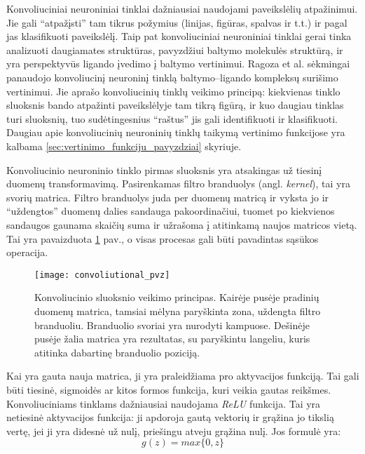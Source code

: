 Konvoliuciniai neuroniniai tinklai dažniausiai naudojami paveikslėlių atpažinimui. Jie gali \enquote{atpažįsti} tam tikrus požymius (linijas, figūras, spalvas ir t.t.) ir pagal jas klasifikuoti paveikslėlį. Taip pat konvoliuciniai neuroniniai tinklai gerai tinka analizuoti daugiamates struktūras, pavyzdžiui baltymo molekulės struktūrą, ir yra perspektyvūs ligando įvedimo į baltymo vertinimui.\cite{hochuli_visualizing_2018} Ragoza et al.\cite{ragoza_proteinligand_2017} sėkmingai panaudojo konvoliucinį neuroninį tinklą baltymo--ligando kompleksų surišimo vertinimui. Jie aprašo konvoliucinių tinklų veikimo principą: kiekvienas tinklo sluoksnis bando atpažinti paveikslėlyje tam tikrą figūrą, ir kuo daugiau tinklas turi sluoksnių, tuo sudėtingesnius \enquote{raštus} jis gali identifikuoti ir klasifikuoti. Daugiau apie konvoliucinių neuroninių tinklų taikymą vertinimo funkcijose yra kalbama \ref{sec:vertinimo_funkciju_pavyzdziai} skyriuje.

Konvoliucinio neuroninio tinklo pirmas sluoksnis yra atsakingas už tiesinį duomenų transformavimą. Pasirenkamas filtro branduolys (angl. \textit{kernel}), tai yra svorių matrica. Filtro branduolys juda per duomenų matricą ir vyksta jo ir \enquote{uždengtos} duomenų dalies sandauga pakoordinačiui, tuomet po kiekvienos sandaugos gaunama skaičių suma ir užrašoma į atitinkamą naujos matricos vietą. Tai yra pavaizduota \ref{fig:convoliutional_pvz} pav., o visas procesas gali būti pavadintas sąsūkos operacija.

\begin{figure}[H]
\centering 
\texttt{[image: convoliutional\_pvz]}
\caption{Konvoliucinio sluoksnio veikimo principas. Kairėje pusėje pradinių duomenų matrica, tamsiai mėlyna paryškinta zona, uždengta filtro branduoliu. Branduolio svoriai yra nurodyti kampuose. Dešinėje pusėje žalia matrica yra rezultatas, su paryškintu langeliu, kuris atitinka dabartinę branduolio poziciją.}
\label{fig:convoliutional_pvz}
\end{figure}

Kai yra gauta nauja matrica, ji yra praleidžiama pro aktyvacijos funkciją. Tai gali būti tiesinė, sigmoidės ar kitos formos funkcija, kuri veikia gautas reikšmes. Konvoliuciniams tinklams dažniausiai naudojama \emph{ReLU} funkcija. Tai yra netiesinė aktyvacijos funkcija: ji apdoroja gautą vektorių ir grąžina jo tikslią vertę, jei ji yra didesnė už nulį, priešingu atveju grąžina nulį. Jos formulė yra:
\begin{equation}
 g(z) = max\{0, z\}
\end{equation}

